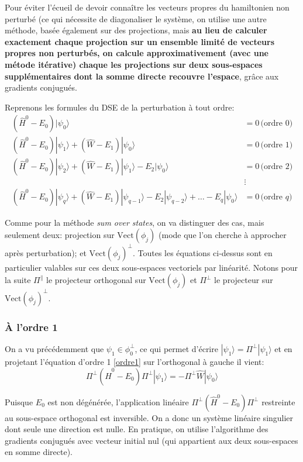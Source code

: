 \documentclass[svgnames,dvipsnames,a4paper,10pt,french]{report}
\begin{document}
Pour éviter l'écueil de devoir connaître les vecteurs propres du hamiltonien non perturbé (ce qui nécessite de diagonaliser le système, on utilise une autre méthode, basée également sur des projections, mais  \textbf{au lieu de calculer exactement chaque projection sur un ensemble limité de vecteurs propres non perturbés, on calcule approximativement (avec une métode itérative) chaque les projections sur deux sous-espaces supplémentaires dont la somme directe recouvre l'espace}, grâce aux gradients conjugués.

Reprenons les formules  du DSE de la perturbation à tout ordre:
\begin{align*}
    (\hat{H}^0-E_0) |\psi_0\rangle &= 0 \, \text{(ordre 0)} \\
    (\hat{H}^0-E_0) |\psi_1\rangle + (\hat{W}-E_1) |\psi_0\rangle &=0 \, \text{(ordre 1)}  \\
    (\hat{H}^0-E_0) |\psi_2\rangle + (\hat{W}-E_1) |\psi_1\rangle - E_2 |\psi_0\rangle &= 0 \, \text{(ordre 2)}  \\
    &\vdots \\
    (\hat{H}^0 - E_0) |\psi_q\rangle + (\hat{W}-E_1)|\psi_{q-1}\rangle -E_2 |\psi_{q-2}\rangle + \dots - E_q |\psi_0\rangle &= 0 \, \text{(ordre $q$)} 
\end{align*}

Comme pour la méthode \textit{sum over states}, on va distinguer des cas, mais seulement deux: projection sur $\mathrm{Vect}(\phi_j)$ (mode que l'on cherche à approcher après perturbation); et $\mathrm{Vect}(\phi_j)^\perp$. Toutes les équations ci-dessus sont en particulier valables sur ces deux sous-espaces vectoriels par linéarité. Notons pour la suite $\Pi^\parallel$ le projecteur orthogonal sur $\mathrm{Vect}(\phi_j)$ et  $\Pi^\perp$ le projecteur sur $ \mathrm{Vect}(\phi_j)^\perp$.

\subsubsection{À l'ordre 1}
On a vu précédemment que $\psi_1 \in \phi_0^\perp$, ce qui permet d'écrire $|\psi_1 \rangle = \Pi^\perp |\psi_1 \rangle$ et  en projetant l'équation d'ordre 1 \ref{ordre1} sur l'orthogonal à gauche il vient:
\begin{equation}
\label{perp_o1}
    \Pi^\perp (\hat{H}^0-E_0) \Pi^\perp |\psi_1\rangle   =-\Pi^\perp \hat{W} |\psi_0\rangle
\end{equation}

Puisque $E_0$ est non dégénérée, l'application linéaire $\Pi^\perp (\hat{H}^0-E_0) \Pi^\perp$ restreinte au sous-espace orthogonal est inversible. On a donc un système linéaire singulier dont seule une direction est nulle. En pratique, on utilise l'algorithme des gradients conjugués avec vecteur initial nul (qui appartient aux deux sous-espaces en somme directe).
\end{document}
